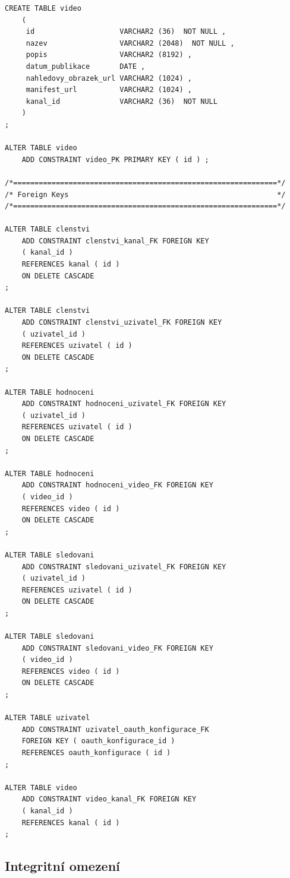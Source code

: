 \documentclass[12pt,a4paper]{article}
\begin{document}
\begin{lstlisting}
CREATE TABLE video
    (
     id                    VARCHAR2 (36)  NOT NULL ,
     nazev                 VARCHAR2 (2048)  NOT NULL ,
     popis                 VARCHAR2 (8192) ,
     datum_publikace       DATE ,
     nahledovy_obrazek_url VARCHAR2 (1024) ,
     manifest_url          VARCHAR2 (1024) ,
     kanal_id              VARCHAR2 (36)  NOT NULL
    )
;

ALTER TABLE video
    ADD CONSTRAINT video_PK PRIMARY KEY ( id ) ;

/*==============================================================*/
/* Foreign Keys                                                 */
/*==============================================================*/

ALTER TABLE clenstvi
    ADD CONSTRAINT clenstvi_kanal_FK FOREIGN KEY
    ( kanal_id )
    REFERENCES kanal ( id )
    ON DELETE CASCADE
;

ALTER TABLE clenstvi
    ADD CONSTRAINT clenstvi_uzivatel_FK FOREIGN KEY
    ( uzivatel_id )
    REFERENCES uzivatel ( id )
    ON DELETE CASCADE
;

ALTER TABLE hodnoceni
    ADD CONSTRAINT hodnoceni_uzivatel_FK FOREIGN KEY
    ( uzivatel_id )
    REFERENCES uzivatel ( id )
    ON DELETE CASCADE
;

ALTER TABLE hodnoceni
    ADD CONSTRAINT hodnoceni_video_FK FOREIGN KEY
    ( video_id )
    REFERENCES video ( id )
    ON DELETE CASCADE
;

ALTER TABLE sledovani
    ADD CONSTRAINT sledovani_uzivatel_FK FOREIGN KEY
    ( uzivatel_id )
    REFERENCES uzivatel ( id )
    ON DELETE CASCADE
;

ALTER TABLE sledovani
    ADD CONSTRAINT sledovani_video_FK FOREIGN KEY
    ( video_id )
    REFERENCES video ( id )
    ON DELETE CASCADE
;

ALTER TABLE uzivatel
    ADD CONSTRAINT uzivatel_oauth_konfigurace_FK
    FOREIGN KEY ( oauth_konfigurace_id )
    REFERENCES oauth_konfigurace ( id )
;

ALTER TABLE video
    ADD CONSTRAINT video_kanal_FK FOREIGN KEY
    ( kanal_id )
    REFERENCES kanal ( id )
;
\end{lstlisting}

\newpage

\subsection{Integritní omezení}
\end{document}
